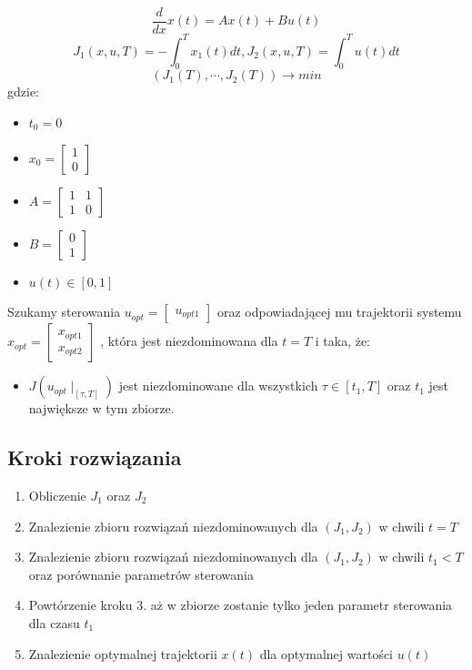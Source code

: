 \documentclass[a4paper]{article}
\begin{document}
$$ \frac{d}{dx} x(t) = A x(t) + B u(t)$$
$$ J_1(x,u,T) = - \int^T_0 x_1(t) dt, J_2(x,u,T) = \int^T_0 u(t) dt$$
$$ ( J_1(T), \cdots, J_2(T) ) \rightarrow min $$
gdzie: 
\begin{itemize}
    \item $t_0 = 0$
    \item $x_0 = \begin{bmatrix} 1 \\ 0 \end{bmatrix} $
    \item $A = \begin{bmatrix} 1 & 1 \\ 1 & 0 \end{bmatrix} $
    \item $B = \begin{bmatrix} 0 \\ 1 \end{bmatrix} $
    \item $u(t) \in [0, 1] $
\end{itemize}
Szukamy sterowania 
$u_{opt} = 
    \begin{bmatrix}
        u_{opt1}
    \end{bmatrix}
$
oraz odpowiadającej mu trajektorii systemu 
$
    x_{opt} = 
    \begin{bmatrix}
        x_{opt1} \\
        x_{opt2}
    \end{bmatrix}
$
, która jest niezdominowana dla $t=T$ i taka, że: 
\begin{itemize}
    \item $J(u_{opt}\mid_{[\tau, T]})$ jest niezdominowane dla wszystkich $\tau \in [t_1, T]$ oraz $t_1$ jest największe w tym zbiorze. 
\end{itemize}

\subsection{Kroki rozwiązania}
\begin{enumerate}
    \item  Obliczenie $J_1$ oraz $J_2$
    \item Znalezienie zbioru rozwiązań niezdominowanych dla $(J_1, J_2)$ w chwili $t=T$
    \item Znalezienie zbioru rozwiązań niezdominowanych dla $(J_1, J_2)$ w chwili $t_1 < T$ oraz porównanie parametrów sterowania 
    \item Powtórzenie kroku 3. aż w zbiorze zostanie tylko jeden parametr sterowania dla czasu $t_1$
    \item  Znalezienie optymalnej trajektorii $x(t)$ dla optymalnej wartości $u(t)$
\end{enumerate}
\end{document}
